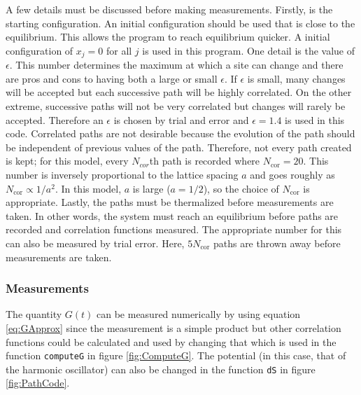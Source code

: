 \documentclass[11pt]{article}
\begin{document}
A few details must be discussed before making measurements. Firstly, is the starting configuration. An initial configuration should be used that is close to the equilibrium. This allows the program to reach equilibrium quicker. A initial configuration of $x_j=0$ for all $j$ is used in this program. One detail is the value of $\epsilon$. This number determines the maximum at which a site can change and there are pros and cons to having both a large or small $\epsilon$. If $\epsilon$ is small, many changes will be accepted but each successive path will be highly correlated. On the other extreme, successive paths will not be very correlated but changes will rarely be accepted. Therefore an $\epsilon$ is chosen by trial and error and $\epsilon=1.4$ is used in this code. Correlated paths are not desirable because the evolution of the path should be independent of previous values of the path. Therefore, not every path created is kept; for this model, every $N_{cor}$th path is recorded where $N_{\text{cor}}=20$. This number is inversely proportional to the lattice spacing $a$ and goes roughly as $N_{\text{cor}}\propto 1/a^2$. In this model, $a$ is large ($a=1/2$), so the choice of $N_{\text{cor}}$ is appropriate. Lastly, the paths must be thermalized before measurements are taken. In other words, the system must reach an equilibrium before paths are recorded and correlation functions measured. The appropriate number for this can also be measured by trial error. Here, $5N_{\text{cor}}$ paths are thrown away before measurements are taken.

\subsubsection{Measurements}
The quantity $G(t)$ can be measured numerically by using equation \ref{eq:GApprox} since the measurement is a simple product but other correlation functions could be calculated  and used by changing that which is used in the function \texttt{computeG} in figure \ref{fig:ComputeG}. The potential (in this case, that of the harmonic oscillator) can also be changed in the function \texttt{dS} in figure \ref{fig:PathCode}.
\end{document}
